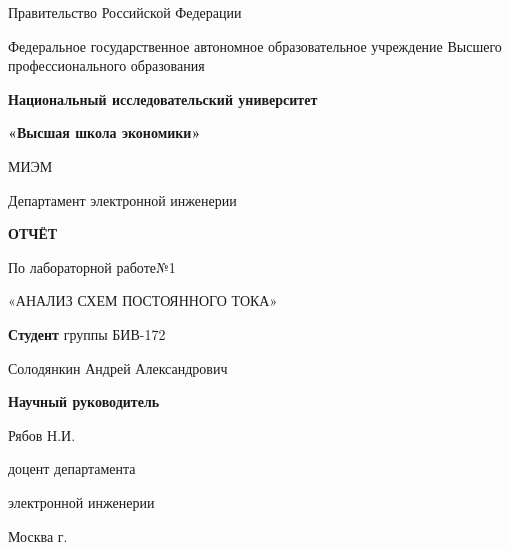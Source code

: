 \begin{titlepage}
	\begin{center}
		Правительство Российской Федерации
	\end{center}

	\begin{center}
	Федеральное государственное автономное образовательное учреждение
	Высшего профессионального образования
	
	\end{center}
	
	\begin{center}
		\textbf{Национальный исследовательский университет}
		
		\textbf{«Высшая школа экономики»}
	\end{center}
	\begin{center}
		МИЭМ
	\end{center}
	\begin{center}
		Департамент электронной инженерии
	\end{center}
	\vspace{1ex}
	\begin{center}
		\textbf{ОТЧЁТ}
		
		По лабораторной работе№1
		
		«АНАЛИЗ СХЕМ ПОСТОЯННОГО ТОКА»
	\end{center}	
	
	\vspace{10ex}
	\begin{flushright}
		\textbf{Студент} группы БИВ-172
		
		Солодянкин Андрей Александрович		
	\end{flushright}
	\vspace{3ex}
	\begin{flushright}
		\textbf{Научный руководитель} 
		
		Рябов Н.И.
		
		доцент департамента
		
		электронной инженерии
			
	\end{flushright}
	\vfill
	\begin{center}
		Москва \the\year г.
	\end{center}
\end{titlepage}